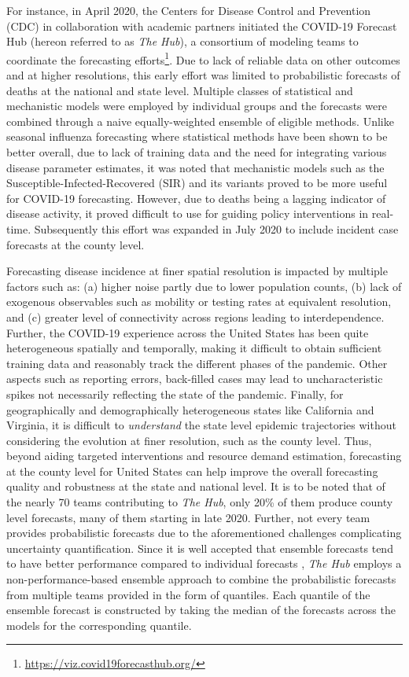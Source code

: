 \documentclass[sigconf]{acmart}
\newcommand{\hub}{\emph{The Hub}}
\begin{document}
For instance, in April 2020, the Centers for Disease Control and Prevention (CDC) in collaboration with academic partners initiated the COVID-19 Forecast Hub (hereon referred to as \hub{}), a consortium of modeling teams to coordinate the forecasting efforts\footnote{\url{https://viz.covid19forecasthub.org/}}. Due to lack of reliable data on other outcomes and at higher resolutions, this early effort was limited to probabilistic forecasts of deaths at the national and state level. Multiple classes of statistical and mechanistic models were employed by individual groups\cite{ray2020ensemble} and the forecasts were combined through a naive equally-weighted ensemble of eligible methods. Unlike seasonal influenza forecasting where statistical methods have been shown to be better overall\cite{reich2019collaborative}, due to lack of training data and the need for integrating various disease parameter estimates, it was noted that mechanistic models such as the Susceptible-Infected-Recovered (SIR) and its variants proved to be more useful for COVID-19 forecasting. However, due to deaths being a lagging indicator of disease activity, it proved difficult to use for guiding policy interventions in real-time. Subsequently this effort was expanded in July 2020 to include incident case forecasts at the county level. 

Forecasting disease incidence at finer spatial resolution is impacted by multiple factors such as: (a) higher noise partly due to lower population counts, (b) lack of exogenous observables such as mobility or testing rates at equivalent resolution, and (c) greater level of connectivity across regions leading to interdependence. Further, the COVID-19 experience across the United States has been quite heterogeneous spatially and temporally, making it difficult to obtain sufficient training data and reasonably track the different phases of the pandemic. Other aspects such as reporting errors, back-filled cases may lead to uncharacteristic spikes not necessarily reflecting the state of the pandemic. Finally, for geographically and demographically heterogeneous states like California and Virginia, it is difficult to \emph{understand} the state level epidemic trajectories without considering the evolution at finer resolution, such as the county level. Thus, beyond aiding targeted interventions and resource demand estimation, forecasting at the county level for United States can help improve the overall forecasting quality and robustness at the state and national level. It is to be noted that of the nearly 70 teams contributing to \hub{}, only 20\% of them produce county level forecasts, many of them starting in late 2020. Further, not every team provides probabilistic forecasts due to the aforementioned challenges complicating uncertainty quantification. Since it is well accepted that ensemble forecasts tend to have better performance compared to individual forecasts \cite{viboud2018rapidd, reich2019collaborative, yamana2016superensemble}, \hub{} employs a non-performance-based ensemble approach to combine the probabilistic forecasts from multiple teams provided in the form of quantiles. Each quantile of the ensemble forecast is constructed by taking the median of the forecasts across the models for the corresponding quantile.
\end{document}
